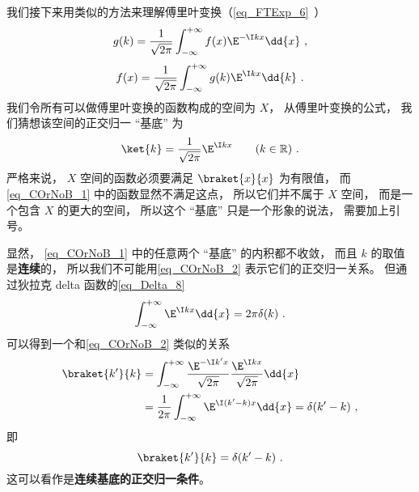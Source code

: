 我们接下来用类似的方法来理解傅里叶变换（\autoref{eq_FTExp_6}~）
\begin{equation}\label{eq_COrNoB_4}
g(k) = \frac{1}{\sqrt{2\pi }} \int_{-\infty }^{+\infty } f(x)\E^{-\I kx} \dd{x}~,
\end{equation}
\begin{equation}\label{eq_COrNoB_3}
f(x) = \frac{1}{\sqrt{2\pi }} \int_{-\infty }^{+\infty } g(k)\E^{\I kx} \dd{k}~.
\end{equation}
我们令所有可以做傅里叶变换的函数构成的空间为 $X$， 从傅里叶变换的公式， 我们猜想该空间的正交归一 “基底” 为
\begin{equation}\label{eq_COrNoB_1}
\ket{k} = \frac{1}{\sqrt{2\pi}} \E^{\I kx} \qquad (k \in \mathbb R)~.
\end{equation}
严格来说， $X$ 空间的函数必须要满足 $\braket{x}{x}$ 为有限值， 而\autoref{eq_COrNoB_1} 中的函数显然不满足这点， 所以它们并不属于 $X$ 空间， 而是一个包含 $X$ 的更大的空间， 所以这个 “基底” 只是一个形象的说法， 需要加上引号。

显然， \autoref{eq_COrNoB_1} 中的任意两个 “基底” 的内积都不收敛， 而且 $k$ 的取值是\textbf{连续}的， 所以我们不可能用\autoref{eq_COrNoB_2} 表示它们的正交归一关系。 但通过狄拉克 delta 函数的\autoref{eq_Delta_8}~
\begin{equation}
\int_{-\infty}^{+\infty} \E^{\I kx}\dd{x} = 2\pi \delta(k)~.
\end{equation}
可以得到一个和\autoref{eq_COrNoB_2} 类似的关系
\begin{equation}\label{eq_COrNoB_11}
\begin{aligned}
\braket{k'}{k} &= \int_{-\infty}^{+\infty} \frac{\E^{-\I k'x}}{\sqrt{2\pi}} \frac{\E^{\I kx}}{\sqrt{2\pi}}\dd{x}\\
&= \frac{1}{2\pi}\int_{-\infty}^{+\infty} \E^{\I (k'-k)x}\dd{x}
= \delta(k' - k)~,
\end{aligned}
\end{equation}
即
\begin{equation}\label{eq_COrNoB_8}
\braket{k'}{k} = \delta(k' - k)~.
\end{equation}
这可以看作是\textbf{连续基底的正交归一条件}。

